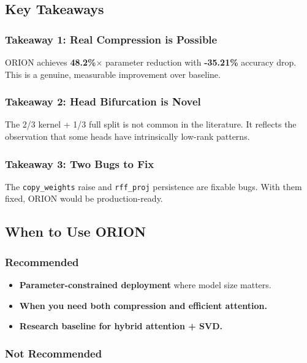 \subsection{Key Takeaways}

\subsubsection{Takeaway 1: Real Compression is Possible}

ORION achieves \textbf{48.2\%$\times$} parameter reduction with \textbf{-35.21\%} 
accuracy drop. This is a genuine, measurable improvement over baseline.

\subsubsection{Takeaway 2: Head Bifurcation is Novel}

The 2/3 kernel + 1/3 full split is not common in the literature. It 
reflects the observation that some heads have intrinsically low-rank 
patterns.

\subsubsection{Takeaway 3: Two Bugs to Fix}

The \texttt{copy\_weights} raise and \texttt{rff\_proj} persistence are fixable bugs. 
With them fixed, ORION would be production-ready.

\subsection{When to Use ORION}

\subsubsection{Recommended}

\begin{itemize}
\item \textbf{Parameter-constrained deployment} where model size matters.
\item \textbf{When you need both compression and efficient attention.}
\item \textbf{Research baseline for hybrid attention + SVD.}

\end{itemize}
\subsubsection{Not Recommended}

